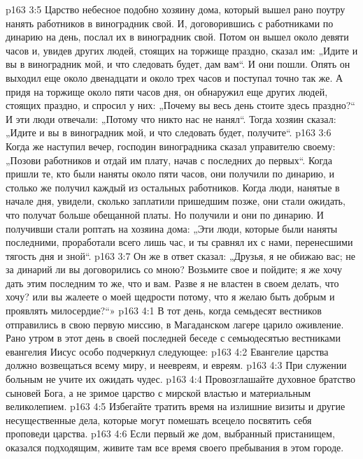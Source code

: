 \vs p163 3:5 Царство небесное подобно хозяину дома, который вышел рано поутру нанять работников в виноградник свой. И, договорившись с работниками по динарию на день, послал их в виноградник свой. Потом он вышел около девяти часов и, увидев других людей, стоящих на торжище праздно, сказал им: „Идите и вы в виноградник мой, и что следовать будет, дам вам“. И они пошли. Опять он выходил еще около двенадцати и около трех часов и поступал точно так же. А придя на торжище около пяти часов дня, он обнаружил еще других людей, стоящих праздно, и спросил у них: „Почему вы весь день стоите здесь праздно?“ И эти люди отвечали: „Потому что никто нас не нанял“. Тогда хозяин сказал: „Идите и вы в виноградник мой, и что следовать будет, получите“.
\vs p163 3:6 Когда же наступил вечер, господин виноградника сказал управителю своему: „Позови работников и отдай им плату, начав с последних до первых“. Когда пришли те, кто были наняты около пяти часов, они получили по динарию, и столько же получил каждый из остальных работников. Когда люди, нанятые в начале дня, увидели, сколько заплатили пришедшим позже, они стали ожидать, что получат больше обещанной платы. Но получили и они по динарию. И получивши стали роптать на хозяина дома: „Эти люди, которые были наняты последними, проработали всего лишь час, и ты сравнял их с нами, перенесшими тягость дня и зной“.
\vs p163 3:7 Он же в ответ сказал: „Друзья, я не обижаю вас; не за динарий ли вы договорились со мною? Возьмите свое и пойдите; я же хочу дать этим последним то же, что и вам. Разве я не властен в своем делать, что хочу? или вы жалеете о моей щедрости потому, что я желаю быть добрым и проявлять милосердие?“»
\vs p163 4:1 В тот день, когда семьдесят вестников отправились в свою первую миссию, в Магаданском лагере царило оживление. Рано утром в этот день в своей последней беседе с семьюдесятью вестниками евангелия Иисус особо подчеркнул следующее:
\vs p163 4:2 \bibnobreakspace Евангелие царства должно возвещаться всему миру, и неевреям, и евреям.
\vs p163 4:3 \bibnobreakspace При служении больным не учите их ожидать чудес.
\vs p163 4:4 \bibnobreakspace Провозглашайте духовное братство сыновей Бога, а не зримое царство с мирской властью и материальным великолепием.
\vs p163 4:5 \bibnobreakspace Избегайте тратить время на излишние визиты и другие несущественные дела, которые могут помешать всецело посвятить себя проповеди царства.
\vs p163 4:6 \bibnobreakspace Если первый же дом, выбранный пристанищем, оказался подходящим, живите там все время своего пребывания в этом городе.
